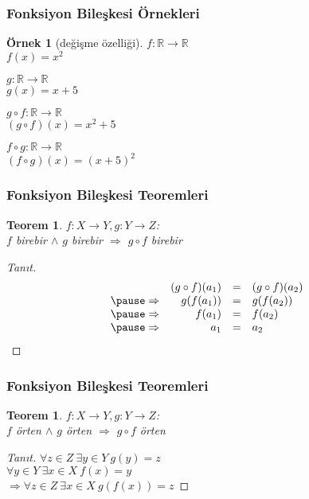 \documentclass[dvipsnames]{beamer}
\theoremstyle{definition}
\theoremstyle{example}
\newtheorem{ornek}[theorem]{Örnek}
\theoremstyle{plain}
\newtheorem{teorem}[theorem]{Teorem}
\begin{document}
\begin{frame}
  \frametitle{Fonksiyon Bileşkesi Örnekleri}

  \begin{ornek}[değişme özelliği]
    $f: \mathbb{R} \rightarrow \mathbb{R}$\\
    $f(x) = x^2$

    \medskip
    $g: \mathbb{R} \rightarrow \mathbb{R}$\\
    $g(x) = x + 5$

    \pause
    \bigskip
    $g \circ f: \mathbb{R} \rightarrow \mathbb{R}$\\
    $(g \circ f)(x) = x^2 + 5$

    \pause
    \medskip
    $f \circ g: \mathbb{R} \rightarrow \mathbb{R}$\\
    $(f \circ g)(x) = (x + 5)^2$
  \end{ornek}
\end{frame}

\begin{frame}
  \frametitle{Fonksiyon Bileşkesi Teoremleri}

  \begin{teorem}
    $f: X \rightarrow Y, g: Y \rightarrow Z$:\\
    $f$ birebir $\wedge$ $g$ birebir $\Rightarrow$ $g \circ f$ birebir
  \end{teorem}

  \pause
  \begin{proof}[Tanıt]
    \[
      \begin{array}{crcl}
                  & (g \circ f) (a_1) & = & (g \circ f) (a_2)\\\pause
      \Rightarrow & g(f(a_1))         & = & g(f(a_2))\\\pause
      \Rightarrow & f(a_1)            & = & f(a_2)\\\pause
      \Rightarrow & a_1               & = & a_2
      \end{array}
    \]
  \end{proof}
\end{frame}

\begin{frame}
  \frametitle{Fonksiyon Bileşkesi Teoremleri}

  \begin{teorem}
    $f: X \rightarrow Y, g: Y \rightarrow Z$:\\
    $f$ örten $\wedge$ $g$ örten $\Rightarrow$ $g \circ f$ örten
  \end{teorem}

  \pause
  \begin{proof}[Tanıt]
    $\forall z \in Z~\exists y \in Y~g(y) = z$\\\pause
    $\forall y \in Y~\exists x \in X~f(x) = y$\\\pause
      $\Rightarrow \forall z \in Z~\exists x \in X~g(f(x)) = z$
  \end{proof}
\end{frame}
\end{document}
